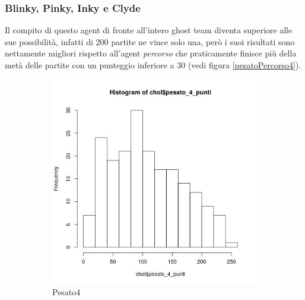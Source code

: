 \documentclass[8pt]{book}
\begin{document}
\subsubsection{Blinky, Pinky, Inky e Clyde}

Il compito di questo agent di fronte all'intero ghost team diventa superiore alle sue possibilità, infatti di $200$ partite ne vince solo una, però i suoi risultati sono nettamente migliori rispetto all'agent \emph{percorso} che praticamente finisce più della metà delle partite con un punteggio inferiore a $30$ (vedi figura \ref{pesatoPercorso4}).

\begin{figure}
  \centering
  \begin{subfigure}[b]{0.49\textwidth}
    \includegraphics[width=\textwidth]{img/pesato_4_punteggio.png}
    \caption{Pesato4}
    \label{Pesato4}
   \end{subfigure}
  \begin{subfigure}[b]{0.49\textwidth}

\end{subfigure}
\end{figure}
\end{document}
